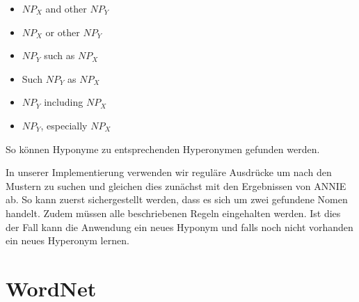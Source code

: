 \begin{itemize}
\item $NP_{X}$ and other $NP_{Y}$
\item $NP_{X}$ or other $NP_{Y}$
\item $NP_{Y}$ such as $NP_{X}$
\item Such $NP_{Y}$ as $NP_{X}$
\item $NP_{Y}$ including $NP_{X}$
\item $NP_{Y}$, especially $NP_{X}$
\end{itemize}

So können Hyponyme zu entsprechenden Hyperonymen gefunden werden.
\cite{Snow:2004}

In unserer Implementierung verwenden wir reguläre Ausdrücke um nach
den Mustern zu suchen und gleichen dies zunächst mit den Ergebnissen
von ANNIE ab. So kann zuerst sichergestellt werden, dass es sich um
zwei gefundene Nomen handelt. Zudem müssen alle beschriebenen Regeln
eingehalten werden. Ist dies der Fall kann die Anwendung ein neues
Hyponym und falls noch nicht vorhanden ein neues Hyperonym lernen.


\section{WordNet}

